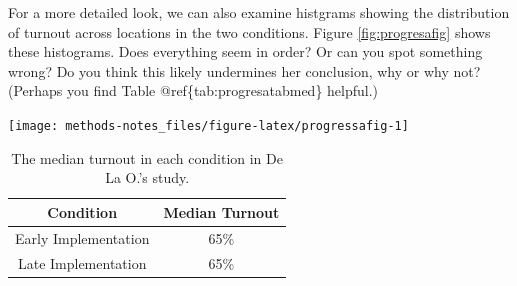 \documentclass[]{book}
\theoremstyle{definition}
\theoremstyle{definition}
\theoremstyle{definition}
\theoremstyle{remark}
\begin{document}
\begin{enumerate}
  For a more detailed look, we can also examine histgrams showing the
  distribution of turnout across locations in the two conditions. Figure
  \ref{fig:progresafig} shows these histograms. Does everything seem in
  order? Or can you spot something wrong? Do you think this likely
  undermines her conclusion, why or why not? (Perhaps you find Table
  @ref\{tab:progresatabmed\} helpful.)

  \begin{center}\texttt{[image: methods-notes\_files/figure-latex/progressafig-1]} \end{center}

  \begin{table}[!h]

  \caption{\label{tab:progressatabmed}The median turnout in each condition in De La O.'s study.}
  \centering
  \begin{tabular}[t]{cc}
  \toprule
  Condition & Median Turnout\\
  \midrule
  Early Implementation & 65\%\\
  Late Implementation & 65\%\\
  \bottomrule
  \end{tabular}
  \end{table}
\end{enumerate}


\end{document}
